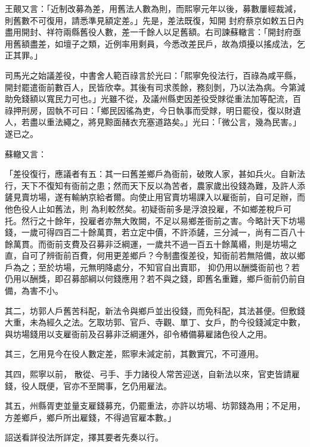 \begin{pinyinscope}
 王覿又言：「近制改募為差，用舊法人數為則，而熙寧元年以後，募數屢經裁減，則舊數不可復用，請悉準見額定差。」先是，差法既復，知開
 封府蔡京如敕五日內盡用開封、祥符兩縣舊役人數，差一千餘人以足舊額。右司諫蘇轍言：「開封府亟用舊額盡差，如壇子之類，近例率用剩員，今悉改差民戶，故為煩擾以搖成法，乞正其罪。」



 司馬光之始議差役，中書舍人範百祿言於光曰：「熙寧免役法行，百祿為咸平縣，開封罷遣衙前數百人，民皆欣幸。其後有司求羨餘，務刻剝，乃以法為病。今第減助免錢額以寬民力可也。」光雖不從，及議州縣吏因差役受賕從重法加等配流，百
 祿押刑房，固執不可曰：「鄉民因徭為吏，今日執事而受賕，明日罷役，復以財遺人，若盡以重法繩之，將見黥面赭衣充塞道路矣。」光曰：「微公言，幾為民害。」遂已之。



 蘇轍又言：



 「差役復行，應議者有五：其一曰舊差鄉戶為衙前，破敗人家，甚如兵火。自新法行，天下不復知有衙前之患；然而天下反以為苦者，農家歲出役錢為難，及許人添鏟見賣坊場，遂有輸納京給者爾。向使止用官賣坊場課入以雇衙前，自可足辦，而他色役人止如舊法，則
 為利較然矣。初疑衙前多是浮浪投雇，不如鄉差稅戶可托。然行之十餘年，投雇者亦無大敗闕，不足以易鄉差衙前之害。今略計天下坊場錢，一歲可得四百二十餘萬貫，若立定中價，不許添鏟，三分減一，尚有二百八十餘萬貫。而衙前支費及召募非泛綱運，一歲共不過一百五十餘萬緡，則是坊場之直，自可了辨衙前百費，何用更差鄉戶？今制盡復差役，知衙前若無陪備，故以鄉戶為之；至於坊場，元無明降處分，不知官自出賣耶，
 抑仍用以酬獎衙前也？若仍用以酬獎，即召募部綱以何錢應用？若不與之錢，即舊名重難，鄉戶衙前仍前自備，為害不小。



 其二，坊郭人戶舊苦科配，新法令與鄉戶並出役錢，而免科配，其法甚便。但敷錢大重，未為經久之法。乞取坊郭、官戶、寺觀、單丁、女戶，酌今役錢減定中數，與坊場錢用以支雇衙前及召募非泛綱運外，卻令樁備募雇諸色役人之用。



 其三，乞用見今在役人數定差，熙寧未減定前，其數實冗，不可遵用。



 其四，熙寧以前，
 散從、弓手、手力諸役人常苦迎送，自新法以來，官吏皆請雇錢，役人既便，官亦不至闕事，乞仍用雇法。



 其五，州縣胥吏並量支雇錢募充，仍罷重法，亦許以坊場、坊郭錢為用；不足用，方差鄉戶，鄉戶所出雇錢，不得過官雇本數。」



 詔送看詳役法所詳定，擇其要者先奏以行。




\end{pinyinscope}
